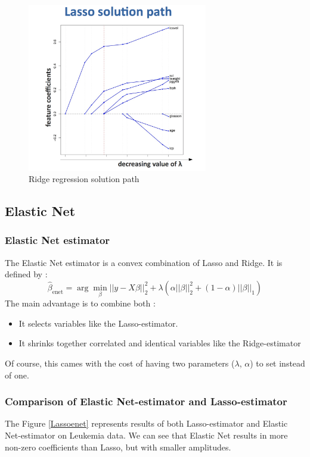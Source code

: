 \documentclass[a4paper,12pt]{article}
\begin{document}
\begin{figure}[!h]
\centerline{
\includegraphics[width = 0.7\textwidth]{figures/solution_path_lasso.png}}
\caption{Ridge regression solution path}
\label{SolutionPathLasso}
\end{figure}

\subsection{Elastic Net}
\subsubsection{Elastic Net estimator}
The Elastic Net estimator is a convex combination of Lasso and Ridge. It is defined by :
\[ \hat{\beta}_\text{enet} = \arg \min_\beta ||y - X\beta||_2^2 + \lambda(\alpha||\beta||_2^2 + (1 - \alpha)||\beta||_1) \]
The main advantage is to combine both :
\begin{itemize}
\item It selects variables like the Lasso-estimator. 
\item It shrinks together correlated and identical variables like the Ridge-estimator
\end{itemize}
Of course, this cames with the cost of having two parameters ($\lambda$, $\alpha$) to set instead of one.

\subsubsection{Comparison of Elastic Net-estimator and Lasso-estimator}
The Figure \ref{Lassoenet} represents results of both Lasso-estimator and Elastic Net-estimator on Leukemia data. We can see that Elastic Net results in more non-zero coefficients than Lasso, but with smaller amplitudes.
\end{document}
